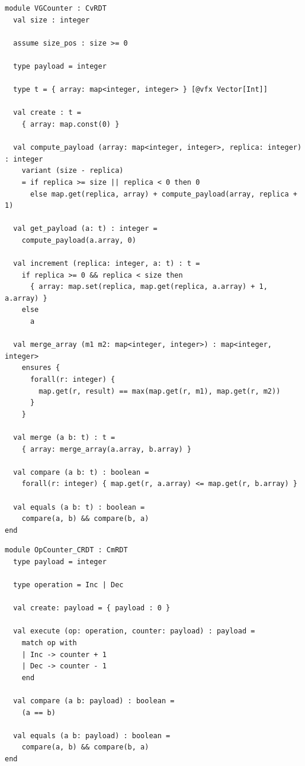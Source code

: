 \begin{lstlisting}[caption={\texttt{VGCounter}}, label={lst:app_vgcounter}]
module VGCounter : CvRDT
  val size : integer

  assume size_pos : size >= 0

  type payload = integer

  type t = { array: map<integer, integer> } [@vfx Vector[Int]]

  val create : t =
    { array: map.const(0) }

  val compute_payload (array: map<integer, integer>, replica: integer) : integer
    variant (size - replica)
    = if replica >= size || replica < 0 then 0
      else map.get(replica, array) + compute_payload(array, replica + 1)

  val get_payload (a: t) : integer =
    compute_payload(a.array, 0)

  val increment (replica: integer, a: t) : t =
    if replica >= 0 && replica < size then
      { array: map.set(replica, map.get(replica, a.array) + 1, a.array) }
    else
      a

  val merge_array (m1 m2: map<integer, integer>) : map<integer, integer>
    ensures {
      forall(r: integer) {
        map.get(r, result) == max(map.get(r, m1), map.get(r, m2))
      }
    }

  val merge (a b: t) : t =
    { array: merge_array(a.array, b.array) }

  val compare (a b: t) : boolean =
    forall(r: integer) { map.get(r, a.array) <= map.get(r, b.array) }

  val equals (a b: t) : boolean =
    compare(a, b) && compare(b, a)
end
\end{lstlisting}

\begin{lstlisting}[caption={\texttt{OpCounter\_CRDT}}, label={lst:app_opcounter}]
module OpCounter_CRDT : CmRDT
  type payload = integer

  type operation = Inc | Dec

  val create: payload = { payload : 0 }

  val execute (op: operation, counter: payload) : payload =
    match op with
    | Inc -> counter + 1
    | Dec -> counter - 1
    end

  val compare (a b: payload) : boolean =
    (a == b)

  val equals (a b: payload) : boolean =
    compare(a, b) && compare(b, a)
end
\end{lstlisting}

